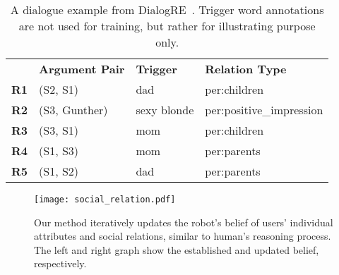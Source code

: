 \documentclass[11pt,a4paper]{article}
\begin{document}
\begin{table}[]
{\begin{tabular}{llll}
\midrule
\textbf{}    & \textbf{Argument Pair}                    & \textbf{Trigger}                   & \textbf{Relation Type}                    \\
\textbf{R1}  & (S2, S1)                                  & dad                                & per:children                              \\
\textbf{R2}  & (S3, Gunther)                             & sexy blonde                        & per:positive\_impression                   \\
\textbf{R3}  & (S3, S1)                                  & mom                                & per:children                              \\
\textbf{R4}  & (S1, S3)                                  & mom                                & per:parents                               \\
\textbf{R5}  & (S1, S2)                                  & dad                                & per:parents                               \\
\bottomrule
\end{tabular}}
\caption{A dialogue example from DialogRE~\citep{yu-etal-2020-dialogue}. Trigger word annotations are not used for training, but rather for illustrating purpose only.}
\label{tab:dialogre} 
\vspace{-5mm}
\end{table}

\begin{figure*}[]
\begin{center}
\centerline{\texttt{[image: social\_relation.pdf]}}
\caption{Our method iteratively updates the robot's belief of users' individual attributes and social relations, similar to human's reasoning process. The left and right graph show the established and updated belief, respectively. }
\label{fig:social_relation}
\end{center}
\vspace{-10mm}
\end{figure*}
\end{document}
